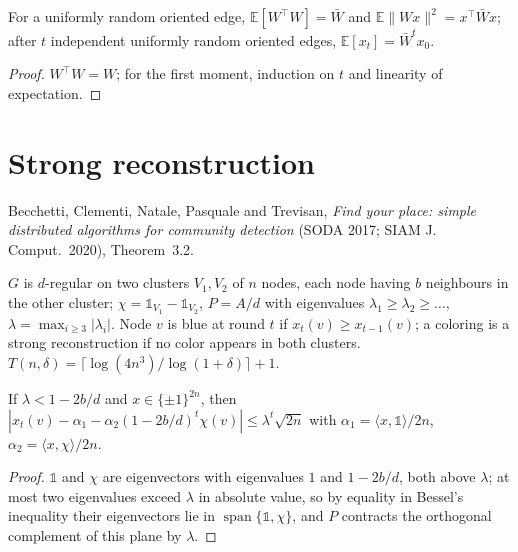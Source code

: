 \begin{theorem}\label{thm:moments}
\leanok{}
For a uniformly random oriented edge, $\mathbb E[W^\top W]=\bar W$ and
$\mathbb E\|Wx\|^2=x^\top\bar Wx$; after $t$ independent uniformly random oriented edges,
$\mathbb E[x_t]=\bar W^tx_0$.
\end{theorem}
\begin{proof}\leanok
$W^\top W=W$; for the first moment, induction on $t$ and linearity of expectation.
\end{proof}

\section{Strong reconstruction}\label{sec:bcnpt-reconstruction}
Becchetti, Clementi, Natale, Pasquale and Trevisan, \emph{Find your place: simple distributed
algorithms for community detection} (SODA 2017; SIAM J. Comput.\ 2020), Theorem~3.2.
\begin{definition}\label{def:clustered}
\leanok{}
$G$ is $d$-regular on two clusters $V_1,V_2$ of $n$ nodes, each node having $b$ neighbours in the
other cluster; $\chi=\mathbb 1_{V_1}-\mathbb 1_{V_2}$, $P=A/d$ with eigenvalues
$\lambda_1\ge\lambda_2\ge\dots$, $\lambda=\max_{i\ge3}|\lambda_i|$. Node $v$ is blue at round $t$
if $x_t(v)\ge x_{t-1}(v)$; a coloring is a strong reconstruction if no color appears in both
clusters. $T(n,\delta)=\lceil\log(4n^3)/\log(1+\delta)\rceil+1$.
\end{definition}
\begin{lemma}[Lemma C.1]\label{lem:c1}
\leanok{}
If $\lambda<1-2b/d$ and $x\in\{\pm1\}^{2n}$, then
$|x_t(v)-\alpha_1-\alpha_2(1-2b/d)^t\chi(v)|\le\lambda^t\sqrt{2n}$ with
$\alpha_1=\langle x,\mathbb 1\rangle/2n$, $\alpha_2=\langle x,\chi\rangle/2n$.
\end{lemma}
\begin{proof}\leanok
$\mathbb 1$ and $\chi$ are eigenvectors with eigenvalues $1$ and $1-2b/d$, both above $\lambda$;
at most two eigenvalues exceed $\lambda$ in absolute value, so by equality in Bessel's inequality
their eigenvectors lie in $\operatorname{span}\{\mathbb 1,\chi\}$, and $P$ contracts the
orthogonal complement of this plane by $\lambda$.
\end{proof}
